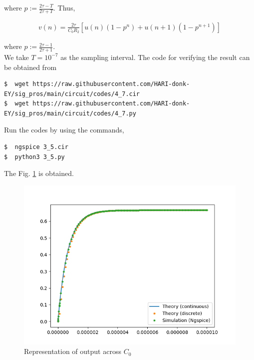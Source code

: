 \documentclass[journal,12pt,twocolumn]{IEEEtran}
\providecommand{\brak}[1]{\ensuremath{\left(#1\right)}}
\providecommand{\sbrak}[1]{\ensuremath{\left[#1\right]}}
\numberwithin{equation}{section}
\numberwithin{figure}{section}
\renewcommand\thesection{\arabic{section}}
\begin{document}
\begin{enumerate}[label=\thesection.\arabic*,ref=\thesection.\theenumi]
			where $p := \frac{2\tau-T}{2\tau+T}$. Thus,

			\begin{align}
				v(n) = \frac{2\tau}{C_0R_2}\sbrak{u(n)\brak{1-p^n}+u(n+1)\brak{1-p^{n+1}}}
			\end{align}

			where $p := \frac{2\tau-1}{2\tau+1}$.\\ We take $T = 10^{-7}$ as the sampling interval. The code for verifying the result can be obtained from

			\begin{lstlisting}
$  wget https://raw.githubusercontent.com/HARI-donk-EY/sig_pros/main/circuit/codes/4_7.cir
$  wget https://raw.githubusercontent.com/HARI-donk-EY/sig_pros/main/circuit/codes/4_7.py
			\end{lstlisting}
			
			Run the codes by using the commands,
			
			\begin{lstlisting}
$  ngspice 3_5.cir
$  python3 3_5.py
			\end{lstlisting}
			The Fig. \ref{fig:4.7} is obtained.
			\begin{figure}[h]
				\begin{center}
					\includegraphics[width=0.7\columnwidth]{figs/4_7}
				\end{center}
				\caption{Representation of output across $C_0$}
				\label{fig:4.7}
			\end{figure}
	\end{enumerate}
\end{document}
